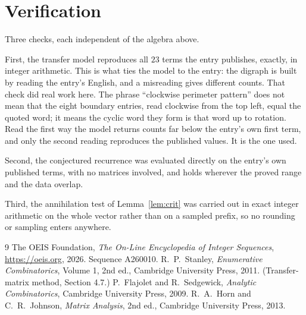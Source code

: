\documentclass[11pt,a4paper]{article}
\theoremstyle{plain}
\theoremstyle{definition}
\begin{document}
\section{Verification}

Three checks, each independent of the algebra above.

First, the transfer model reproduces all $23$ terms the entry publishes, exactly, in
integer arithmetic. This is what ties the model to the entry: the digraph is built by reading
the entry's English, and a misreading gives different counts. That check did real work here. The phrase ``clockwise perimeter pattern'' does not mean that the eight boundary entries, read clockwise from the top left, equal the quoted word; it means the cyclic word they form is that word up to rotation. Read the first way the model returns counts far below the entry's own first term, and only the second reading reproduces the published values. It is the one used.

Second, the conjectured recurrence was evaluated directly on the entry's own published terms,
with no matrices involved, and holds wherever the proved range and the data overlap.

Third, the annihilation test of Lemma~\ref{lem:crit} was carried out in exact integer
arithmetic on the whole vector rather than on a sampled prefix, so no rounding or sampling
enters anywhere.

\begin{thebibliography}{9}
 The OEIS Foundation, \emph{The On-Line Encyclopedia of Integer
Sequences}, \url{https://oeis.org}, 2026. Sequence A260010.
 R.~P.~Stanley, \emph{Enumerative Combinatorics}, Volume 1, 2nd ed.,
Cambridge University Press, 2011. (Transfer-matrix method, Section 4.7.)
 P.~Flajolet and R.~Sedgewick, \emph{Analytic Combinatorics}, Cambridge
University Press, 2009.
 R.~A.~Horn and C.~R.~Johnson, \emph{Matrix Analysis}, 2nd ed., Cambridge
University Press, 2013.
\end{thebibliography}
\end{document}
